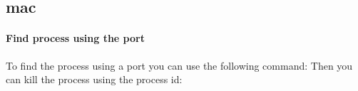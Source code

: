 \subsection{mac}
\paragraph{Find process using the port}

To find the process using a port you can use the following command:  Then you can kill the process using the process id: 